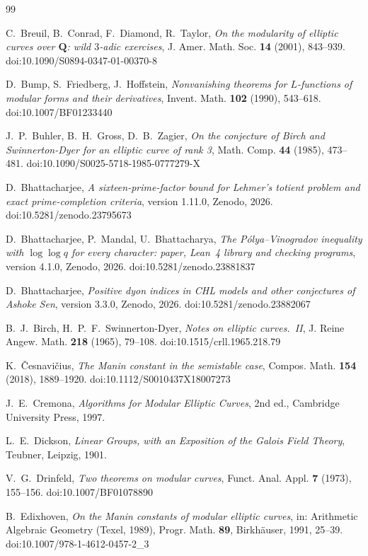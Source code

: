\documentclass[11pt]{amsart}
\theoremstyle{definition}
\newcommand{\Q}{\mathbf{Q}}
\begin{document}
\begingroup\raggedright
\begin{thebibliography}{99}

 C.~Breuil, B.~Conrad, F.~Diamond, R.~Taylor, \emph{On the modularity of elliptic curves over $\Q$: wild $3$-adic exercises}, J. Amer. Math. Soc. \textbf{14} (2001), 843--939. doi:10.1090/S0894-0347-01-00370-8

 D.~Bump, S.~Friedberg, J.~Hoffstein, \emph{Nonvanishing theorems for $L$-functions of modular forms and their derivatives}, Invent. Math. \textbf{102} (1990), 543--618. doi:10.1007/BF01233440

 J.~P.~Buhler, B.~H.~Gross, D.~B.~Zagier, \emph{On the conjecture of Birch and Swinnerton-Dyer for an elliptic curve of rank 3}, Math. Comp. \textbf{44} (1985), 473--481. doi:10.1090/S0025-5718-1985-0777279-X

 D.~Bhattacharjee, \emph{A sixteen-prime-factor bound for Lehmer's totient problem and exact prime-completion criteria}, version 1.11.0, Zenodo, 2026. doi:10.5281/zenodo.23795673

 D.~Bhattacharjee, P.~Mandal, U.~Bhattacharya, \emph{The P\'olya--Vinogradov inequality with $\log\log q$ for every character: paper, Lean~4 library and checking programs}, version 4.1.0, Zenodo, 2026. doi:10.5281/zenodo.23881837

 D.~Bhattacharjee, \emph{Positive dyon indices in CHL models and other conjectures of Ashoke Sen}, version 3.3.0, Zenodo, 2026. doi:10.5281/zenodo.23882067

 B.~J.~Birch, H.~P.~F.~Swinnerton-Dyer, \emph{Notes on elliptic curves.\ II}, J. Reine Angew. Math. \textbf{218} (1965), 79--108. doi:10.1515/crll.1965.218.79

 K.~\v{C}esnavi\v{c}ius, \emph{The Manin constant in the semistable case}, Compos. Math. \textbf{154} (2018), 1889--1920. doi:10.1112/S0010437X18007273

 J.~E.~Cremona, \emph{Algorithms for Modular Elliptic Curves}, 2nd ed., Cambridge University Press, 1997.

 L.~E.~Dickson, \emph{Linear Groups, with an Exposition of the Galois Field Theory}, Teubner, Leipzig, 1901.

 V.~G.~Drinfeld, \emph{Two theorems on modular curves}, Funct. Anal. Appl. \textbf{7} (1973), 155--156. doi:10.1007/BF01078890

 B.~Edixhoven, \emph{On the Manin constants of modular elliptic curves}, in: Arithmetic Algebraic Geometry (Texel, 1989), Progr. Math. \textbf{89}, Birkh\"auser, 1991, 25--39. doi:10.1007/978-1-4612-0457-2\_3


\end{thebibliography}
\end{document}
